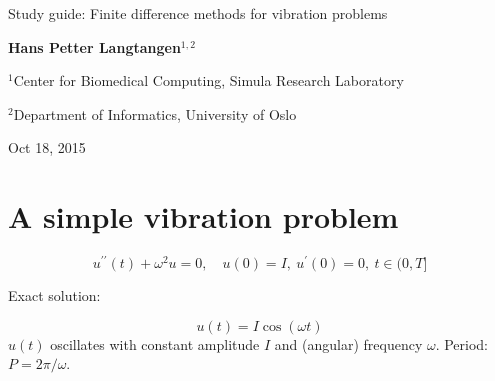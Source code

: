 \documentclass[%
oneside,                 %
final,                   %
10pt]{article}
\begin{document}







\thispagestyle{empty}

\begin{center}
{\LARGE\bf
\begin{spacing}{1.25}
Study guide: Finite difference methods for vibration problems
\end{spacing}
}
\end{center}


\begin{center}
{\bf Hans Petter Langtangen${}^{1, 2}$} \\ [0mm]
\end{center}

\begin{center}
\centerline{{\small ${}^1$Center for Biomedical Computing, Simula Research Laboratory}}
\centerline{{\small ${}^2$Department of Informatics, University of Oslo}}
\end{center}
    

\begin{center}
Oct 18, 2015
\end{center}

\vspace{1cm}


\section*{A simple vibration problem}


\[
u^{\prime\prime}(t) + \omega^2u = 0,\quad u(0)=I,\ u^{\prime}(0)=0,\ t\in (0,T]
\]

Exact solution:

\[
u(t) = I\cos (\omega t)
\]
$u(t)$ oscillates with constant amplitude $I$ and
(angular) frequency $\omega$.
Period: $P=2\pi/\omega$.
\end{document}
